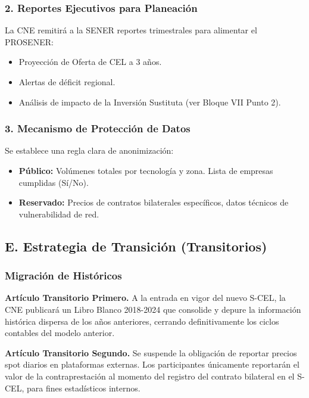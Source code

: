 \documentclass{cel}
\begin{document}
\subsubsection{2. Reportes Ejecutivos para Planeación}
\nopagebreak

La CNE remitirá a la SENER reportes trimestrales para alimentar el PROSENER:


\begin{itemize}
\item Proyección de Oferta de CEL a 3 años.
\item Alertas de déficit regional.
\item Análisis de impacto de la \textquotedbl{}Inversión Sustituta\textquotedbl{} (ver Bloque VII Punto 2).

\end{itemize}
\subsubsection{3. Mecanismo de Protección de Datos}
\nopagebreak

Se establece una regla clara de anonimización:


\begin{itemize}
\item \textbf{Público:} Volúmenes totales por tecnología y zona. Lista de empresas cumplidas (Sí/No).
\item \textbf{Reservado:} Precios de contratos bilaterales específicos, datos técnicos de vulnerabilidad de red.

\end{itemize}
\subsection{E. Estrategia de Transición (Transitorios)}
\nopagebreak

\subsubsection{Migración de Históricos}
\nopagebreak

\textbf{Artículo Transitorio Primero.} A la entrada en vigor del nuevo S-CEL, la CNE publicará un \textquotedbl{}Libro Blanco 2018-2024\textquotedbl{} que consolide y depure la información histórica dispersa de los años anteriores, cerrando definitivamente los ciclos contables del modelo anterior.


\textbf{Artículo Transitorio Segundo.} Se suspende la obligación de reportar \textquotedbl{}precios spot\textquotedbl{} diarios en plataformas externas. Los participantes únicamente reportarán el valor de la contraprestación al momento del registro del contrato bilateral en el S-CEL, para fines estadísticos internos.
\end{document}
